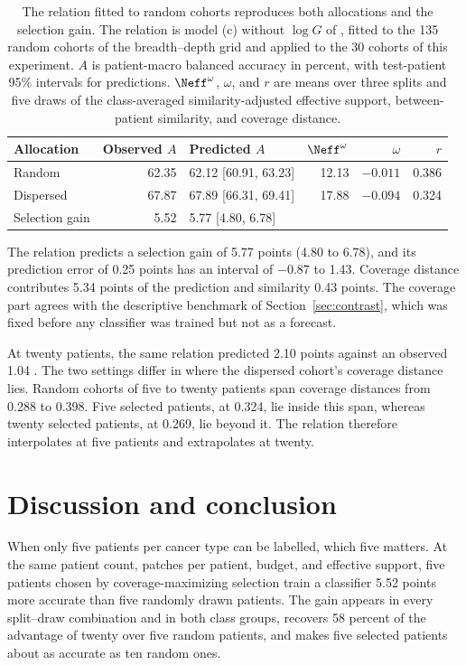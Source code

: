 \begin{table}[htbp]
\centering
\small
\renewcommand{\arraystretch}{1.15}
\begin{tabular}{@{}lrlrrr@{}}
\toprule
Allocation & Observed $A$ & Predicted $A$ & $\Neff^{\omega}$ & $\omega$ & $r$ \\
\midrule
Random & 62.35 & 62.12 [60.91, 63.23] & 12.13 & $-0.011$ & 0.386 \\
Dispersed & 67.87 & 67.89 [66.31, 69.41] & 17.88 & $-0.094$ & 0.324 \\
\addlinespace
Selection gain & 5.52 & 5.77 [4.80, 6.78] & & & \\
\bottomrule
\end{tabular}
\caption{The relation fitted to random cohorts reproduces both allocations and the selection gain. The relation is model (c) without $\log G$ of \citet{queisler2026coverageRedundancy}, fitted to the 135 random cohorts of the breadth--depth grid and applied to the 30 cohorts of this experiment. $A$ is patient-macro balanced accuracy in percent, with test-patient 95\% intervals for predictions. $\Neff^{\omega}$, $\omega$, and $r$ are means over three splits and five draws of the class-averaged similarity-adjusted effective support, between-patient similarity, and coverage distance.}
\label{tab:relation}
\end{table}

\noindent The relation predicts a selection gain of 5.77 points (4.80 to 6.78), and its prediction error of 0.25 points has an interval of $-0.87$ to 1.43. Coverage distance contributes 5.34 points of the prediction and similarity 0.43 points. The coverage part agrees with the descriptive benchmark of Section~\ref{sec:contrast}, which was fixed before any classifier was trained but not as a forecast.

At twenty patients, the same relation predicted 2.10 points against an observed 1.04 \citep{queisler2026coverageRedundancy}. The two settings differ in where the dispersed cohort's coverage distance lies. Random cohorts of five to twenty patients span coverage distances from 0.288 to 0.398. Five selected patients, at 0.324, lie inside this span, whereas twenty selected patients, at 0.269, lie beyond it. The relation therefore interpolates at five patients and extrapolates at twenty.

\section{Discussion and conclusion}
\label{sec:discussion}
When only five patients per cancer type can be labelled, which five matters. At the same patient count, patches per patient, budget, and effective support, five patients chosen by coverage-maximizing selection train a classifier 5.52 points more accurate than five randomly drawn patients. The gain appears in every split--draw combination and in both class groups, recovers 58 percent of the advantage of twenty over five random patients, and makes five selected patients about as accurate as ten random ones.

